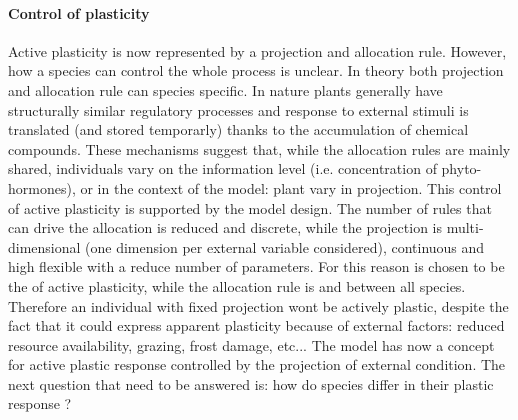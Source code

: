 \paragraph{Control of plasticity}
Active plasticity is now represented by a projection and allocation rule. However, how a species can control the whole process is unclear. In theory both projection and allocation rule can species specific. In nature plants generally have structurally similar regulatory processes and response to external stimuli is translated (and stored temporarly) thanks to the accumulation of chemical compounds\cite{need-references}. These mechanisms suggest that, while the allocation rules are mainly  shared, individuals vary on the information level (i.e. concentration of phyto-hormones), or in the context of the model: plant vary in projection. This control  of active plasticity is supported by the model design. The number of rules that can drive the allocation is reduced and discrete, while the projection is multi-dimensional (one dimension per external variable considered), continuous and high flexible with a reduce number of parameters.
For this reason  is chosen to be the  of active plasticity, while the allocation rule is  and  between all species. Therefore an individual with fixed projection wont be actively plastic, despite the fact that it could express apparent plasticity because of external factors: reduced resource availability, grazing, frost damage, etc... The model has now a concept for active plastic response controlled by the projection of external condition. The next question that need to be answered is: how do species differ in their plastic response ?\\


